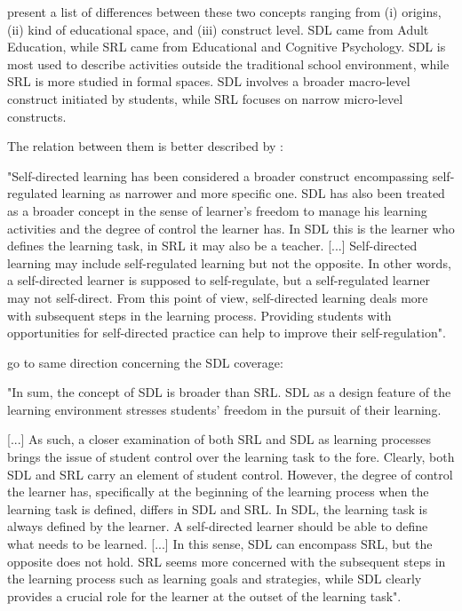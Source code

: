  present a list of differences between these two concepts ranging from (i) origins, (ii) kind of educational space, and (iii) construct level. \gls{SDL} came from Adult Education, while \gls{SRL} came from Educational and Cognitive Psychology. \gls{SDL} is most used to describe activities outside the traditional school environment, while \gls{SRL} is more studied in formal spaces. \gls{SDL} involves a broader macro-level construct initiated by students, while \gls{SRL} focuses on narrow micro-level constructs.

The relation between them is better described by \cite[p.~192]{saks:2014}:
\begin{citacao}
    "Self-directed learning has been considered a broader construct encompassing self-regulated learning as narrower and more specific one. SDL has also been treated as a broader concept in the sense of learner's freedom to manage his learning activities and the degree of control the learner has. In SDL this is the learner who defines the learning task, in SRL it may also be a teacher. [...] Self-directed learning may include self-regulated learning but not the opposite. In other words, a self-directed learner is supposed to self-regulate, but a self-regulated learner may not self-direct. From this point of view, self-directed learning deals more with subsequent steps in the learning process. Providing students with opportunities for self-directed practice can help to improve their self-regulation".
\end{citacao}
 go to same direction concerning the \gls{SDL} coverage:
\begin{citacao}
    "In sum, the concept of SDL is broader than SRL. SDL as a design feature of the learning environment stresses students' freedom in the pursuit of their learning. 
    
    [...] As such, a closer examination of both SRL and SDL as learning processes brings the issue of student control over the learning task to the fore. Clearly, both SDL and SRL carry an element of student control. However, the degree of control the learner has, specifically at the beginning of the learning process when the learning task is defined, differs in SDL and SRL. In SDL, the learning task is always defined by the learner. A self-directed learner should be able to define what needs to be learned. [...] In this sense, SDL can encompass SRL, but the opposite does not hold. SRL seems more concerned with the subsequent steps in the learning process such as learning goals and strategies, while SDL clearly provides a crucial role for the learner at the outset of the learning task".
\end{citacao}